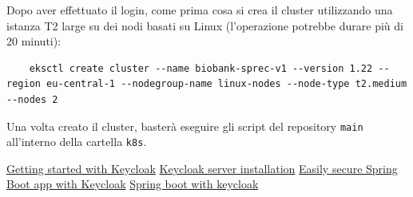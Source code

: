 \documentclass{article}
\begin{document}
Dopo aver effettuato il login, come prima cosa si crea il cluster utilizzando una istanza T2 large su dei nodi basati su Linux (l'operazione potrebbe durare più di 20 minuti):

\begin{verbatim}
    eksctl create cluster --name biobank-sprec-v1 --version 1.22 --region eu-central-1 --nodegroup-name linux-nodes --node-type t2.medium --nodes 2
\end{verbatim}

Una volta creato il cluster, basterà eseguire gli script del repository \texttt{main} all'interno della cartella \texttt{k8s}.


\pagebreak

\begin{thebibliography}{4}
     \href{https://www.keycloak.org/docs/11.0/getting_started/}{Getting started with Keycloak}
     \href{https://www.keycloak.org/docs/latest/server_installation/}{Keycloak server installation}
     \href{https://www.keycloak.org/2017/05/easily-secure-your-spring-boot.html}{Easily secure Spring Boot app with Keycloak}
     \href{https://www.baeldung.com/spring-boot-keycloak}{Spring boot with keycloak}

\end{thebibliography}


\pagebreak
\end{document}
